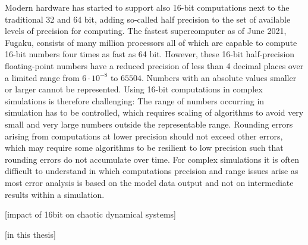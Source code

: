 Modern hardware has started to support also 16-bit computations next to the traditional 32 and 64 bit,
adding so-called half precision to the set of available levels of precision for computing.
The fastest supercomputer as of June 2021, Fugaku, consists of many million processors all of which are capable
to compute 16-bit numbers four times as fast as 64 bit. However, these 16-bit half-precision floating-point numbers
have a reduced precision of less than 4 decimal places over a limited range from $6 \cdot 10^{-8}$ to $65504$.
Numbers with an absolute values smaller or larger cannot be represented. Using 16-bit computations in 
complex simulations is therefore challenging: The range of numbers occurring in simulation has to be controlled,
which requires scaling of algorithms to avoid very small and very large numbers outside the representable range.
Rounding errors arising from computations at lower precision should not exceed other errors, which may require
some algorithms to be resilient to low precision such that rounding errors do not accumulate over time. 
For complex simulations it is often difficult to understand in which computations precision and range issues arise
as most error analysis is based on the model data output and not on intermediate results within a simulation.

[impact of 16bit on chaotic dynamical systems]

[in this thesis]

